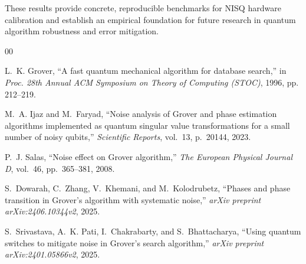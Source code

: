 \documentclass[conference]{IEEEtran}
\begin{document}
These results provide concrete, reproducible benchmarks for NISQ hardware calibration
and establish an empirical foundation for future research in quantum algorithm
robustness and error mitigation.

\balance
\begin{thebibliography}{00}

L.~K. Grover, ``A fast quantum mechanical algorithm for database search,''
in \textit{Proc. 28th Annual ACM Symposium on Theory of Computing (STOC)},
1996, pp. 212--219.

M.~A. Ijaz and M.~Faryad, ``Noise analysis of Grover and phase estimation
algorithms implemented as quantum singular value transformations for a small
number of noisy qubits,'' \textit{Scientific Reports}, vol.~13, p.~20144, 2023.

P.~J. Salas, ``Noise effect on Grover algorithm,''
\textit{The European Physical Journal D}, vol.~46, pp.~365--381, 2008.

S.~Dowarah, C.~Zhang, V.~Khemani, and M.~Kolodrubetz,
``Phases and phase transition in Grover's algorithm with systematic noise,''
\textit{arXiv preprint arXiv:2406.10344v2}, 2025.

S.~Srivastava, A.~K. Pati, I.~Chakrabarty, and S.~Bhattacharya,
``Using quantum switches to mitigate noise in Grover's search algorithm,''
\textit{arXiv preprint arXiv:2401.05866v2}, 2025.

\end{thebibliography}
\end{document}
